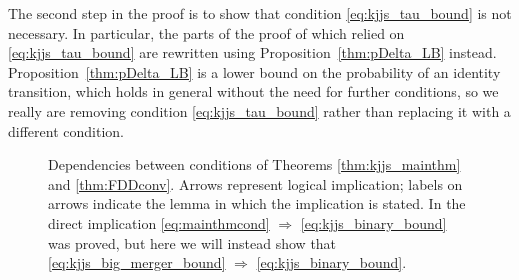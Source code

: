 The second step in the proof is to show that condition \eqref{eq:kjjs_tau_bound} is not necessary. In particular, the parts of the proof of \textcite{koskela2018} which relied on \eqref{eq:kjjs_tau_bound} are rewritten using Proposition~\ref{thm:pDelta_LB} instead. 
Proposition~\ref{thm:pDelta_LB} is a lower bound on the probability of an identity transition, which holds in general without the need for further conditions, so we really are removing condition \eqref{eq:kjjs_tau_bound} rather than replacing it with a different condition.


\begin{figure}[ht]
\centering
{}
\caption[Dependencies between conditions of Theorems \ref{thm:kjjs_mainthm} and \ref{thm:FDDconv}]{Dependencies between conditions of Theorems \ref{thm:kjjs_mainthm} and \ref{thm:FDDconv}. Arrows represent logical implication; labels on arrows indicate the lemma in which the implication is stated.
In \textcite[Lemma 3.4]{brown2021} the direct implication \eqref{eq:mainthmcond} $\Rightarrow$ \eqref{eq:kjjs_binary_bound} was proved, but here we will instead show that \eqref{eq:kjjs_big_merger_bound} $\Rightarrow$ \eqref{eq:kjjs_binary_bound}.
}
\label{fig:FDD_proof_dependencies}
\end{figure}


